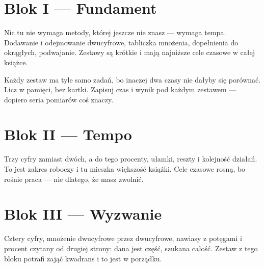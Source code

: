 %
%

\chapter{Blok I — Fundament}

Nic tu nie wymaga metody, której jeszcze nie znasz — wymaga tempa. Dodawanie
i odejmowanie dwucyfrowe, tabliczka mnożenia, dopełnienia do okrągłych,
podwajanie. Zestawy są krótkie i mają najniższe cele czasowe w całej książce.

Każdy zestaw ma tyle samo zadań, bo inaczej dwa czasy nie dałyby się
porównać. Licz w pamięci, bez kartki. Zapisuj czas i wynik pod każdym
zestawem — dopiero seria pomiarów coś znaczy.



\chapter{Blok II — Tempo}

Trzy cyfry zamiast dwóch, a do tego procenty, ułamki, reszty i kolejność
działań. To jest zakres roboczy i tu mieszka większość książki. Cele czasowe
rosną, bo rośnie praca — nie dlatego, że masz zwolnić.



\chapter{Blok III — Wyzwanie}

Cztery cyfry, mnożenie dwucyfrowe przez dwucyfrowe, nawiasy z potęgami
i procent czytany od drugiej strony: dana jest część, szukana całość.
Zestaw z tego bloku potrafi zająć kwadrans i to jest w porządku.

